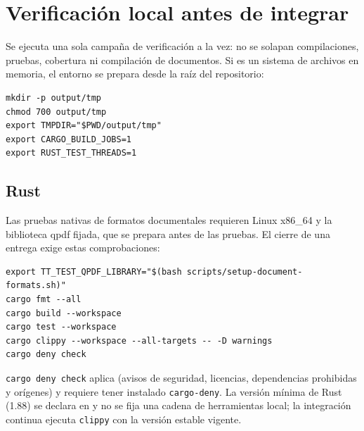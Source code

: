 \section{Verificación local antes de integrar}\label{sec:mant-verificacion}

Se ejecuta una sola campaña de verificación a la vez: no se solapan
compilaciones, pruebas, cobertura ni compilación de documentos. Si
 es un sistema de archivos en memoria, el entorno se prepara
desde la raíz del repositorio:

\begin{verbatim}
mkdir -p output/tmp
chmod 700 output/tmp
export TMPDIR="$PWD/output/tmp"
export CARGO_BUILD_JOBS=1
export RUST_TEST_THREADS=1
\end{verbatim}

\subsection{Rust}\label{sec:mant-rust}

Las pruebas nativas de formatos documentales requieren Linux x86\_64 y la
biblioteca qpdf fijada, que se prepara antes de las pruebas. El cierre de una
entrega exige estas comprobaciones:

\begin{verbatim}
export TT_TEST_QPDF_LIBRARY="$(bash scripts/setup-document-formats.sh)"
cargo fmt --all
cargo build --workspace
cargo test --workspace
cargo clippy --workspace --all-targets -- -D warnings
cargo deny check
\end{verbatim}

\texttt{cargo deny check} aplica  (avisos de seguridad,
licencias, dependencias prohibidas y orígenes) y requiere tener instalado
\texttt{cargo-deny}. La versión mínima de Rust (1.88) se declara en
 y no se fija una cadena de herramientas local; la
integración continua ejecuta \texttt{clippy} con la versión estable vigente.


